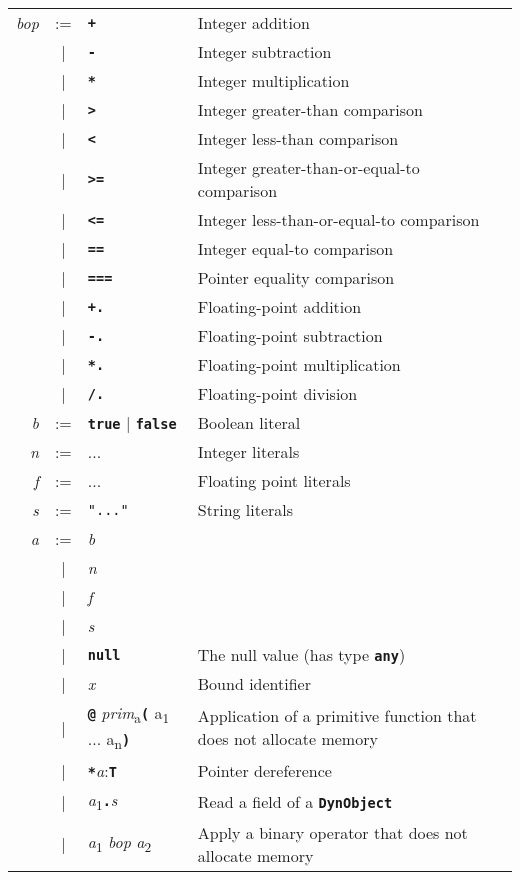 \documentclass{book}
\newcommand{\kw}[1]{\textbf{\texttt{#1}}}
\newcommand{\metavar}[1]{\textit{#1}}
\begin{document}
\begin{tabular}{rcll}
\metavar{bop} & := & \kw{+}   & Integer addition \\
              & |  & \kw{-}   & Integer subtraction \\
              & |  & \kw{*}   & Integer multiplication \\
              & |  & \kw{>}   & Integer greater-than comparison \\
              & |  & \kw{<}   & Integer less-than comparison \\
              & |  & \kw{>=}  & Integer greater-than-or-equal-to comparison \\
              & |  & \kw{<=}  & Integer less-than-or-equal-to comparison \\
              & |  & \kw{==}  & Integer equal-to comparison \\
              & |  & \kw{===} & Pointer equality comparison \\
              & |  & \kw{+.}  & Floating-point addition \\
              & |  & \kw{-.}  & Floating-point subtraction \\
              & |  & \kw{*.}  & Floating-point multiplication \\
              & |  & \kw{/.}  & Floating-point division \\
\metavar{b}   & := & \kw{true} | \kw{false} & Boolean literal \\
\metavar{n}   & := & ... & Integer literals \\
\metavar{f}   & := & ... & Floating point literals \\
\metavar{s}   & := & \texttt{"..."} & String literals \\
\metavar{a}   & := & \metavar{b} \\
              & |  & \metavar{n} \\
              & |  & \metavar{f} \\
              & |  & \metavar{s} \\
              & |  & \kw{null} & The null value (has type \kw{any}) \\
              & |  & \metavar{x} & Bound identifier \\
              & |  & \kw{@} \metavar{prim}\textsubscript{a}\kw{(} a\textsubscript{1} ... a\textsubscript{n}\kw{)}
                   & Application of a primitive function that does not allocate memory \\ 
              & |  & \kw{*}\metavar{a}{:}\kw{T}
                   & Pointer dereference \\
              & |  & \metavar{a}\textsubscript{1}\kw{.}\metavar{s}
                   & Read a field of a \kw{DynObject} \\
              & |  & \metavar{a}\textsubscript{1} \metavar{bop} \metavar{a}\textsubscript{2}
                   & Apply a binary operator that does not allocate memory
\end{tabular}
\end{document}
